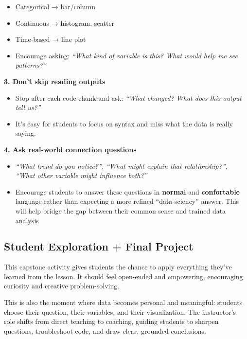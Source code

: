 \documentclass[
  letterpaper,
  DIV=11,
  numbers=noendperiod,
  oneside]{scrartcl}
\begin{document}
\begin{itemize}
\item
  Categorical → bar/column
\item
  Continuous → histogram, scatter
\item
  Time-based → line plot
\item
  Encourage asking: \emph{``What kind of variable is this? What would
  help me see patterns?''}
\end{itemize}

\textbf{3. Don't skip reading outputs}

\begin{itemize}
\item
  Stop after each code chunk and ask: \emph{``What changed? What does
  this output tell us?''}
\item
  It's easy for students to focus on syntax and miss what the data is
  really saying.
\end{itemize}

\textbf{4. Ask real-world connection questions}

\begin{itemize}
\item
  \emph{``What trend do you notice?'', ``What might explain that
  relationship?'', ``What other variable might influence both?''}
\item
  Encourage students to answer these questions in \textbf{normal} and
  \textbf{confortable} language rather than expecting a more refined
  ``data-sciency'' answer. This will help bridge the gap between their
  common sense and trained data analysis
\end{itemize}

\hypertarget{student-exploration-final-project}{%
\subsection{Student Exploration + Final
Project}\label{student-exploration-final-project}}

This capstone activity gives students the chance to apply everything
they've learned from the lesson. It should feel open-ended and
empowering, encouraging curiosity and creative problem-solving.

This is also the moment where data becomes personal and meaningful:
students choose their question, their variables, and their
visualization. The instructor's role shifts from direct teaching to
coaching, guiding students to sharpen questions, troubleshoot code, and
draw clear, grounded conclusions.
\end{document}
